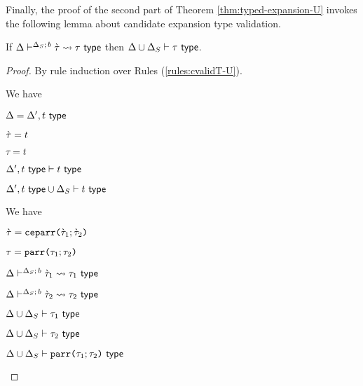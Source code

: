 
Finally, the proof of the second part of Theorem \ref{thm:typed-expansion-U} invokes the following lemma about candidate expansion type validation.
\begin{lemma}\label{lemma:candidate-expansion-type-validation}
If $\Delta\vdash^{\Delta_S;\,b} \grave{\tau} \leadsto \tau~\mathsf{type}$ then ${\Delta}\cup{\Delta_S} \vdash \tau~\mathsf{type}$.
\end{lemma}
\begin{proof} By rule induction over Rules (\ref{rules:cvalidT-U}).
\begin{byCases}
\item[\text{(\ref{rule:cvalidT-U-tvar})}] We have 
\begin{pfsteps*}
   \item $\Delta=\Delta', t~\mathsf{type}$ 
   \item $\grave{\tau}=t$ 
   \item $\tau=t$ 
   \item $\Delta', t~\mathsf{type} \vdash t~\mathsf{type}$  
   \item ${\Delta', t~\mathsf{type}}\cup{\Delta_S} \vdash t~\mathsf{type}$ 
 \end{pfsteps*} 
\resetpfcounter

\item[\text{(\ref{rule:cvalidT-U-parr})}] We have
\begin{pfsteps*}
  \item $\grave{\tau}=\texttt{ceparr}\texttt{(}\grave{\tau}_1; \grave{\tau}_2\texttt{)}$ 
  \item $\tau=\texttt{parr}\texttt{(}\tau_1; \tau_2\texttt{)}$ 
  \item $\Delta\vdash^{\Delta_S;\,b} \grave{\tau}_1 \leadsto \tau_1~\mathsf{type}$  
  \item $\Delta\vdash^{\Delta_S;\,b} \grave{\tau}_2 \leadsto \tau_2~\mathsf{type}$  
  \item ${\Delta}\cup{\Delta_S} \vdash \tau_1~\mathsf{type}$  
  \item ${\Delta}\cup{\Delta_S} \vdash \tau_2~\mathsf{type}$  
  \item ${\Delta}\cup{\Delta_S} \vdash \texttt{parr}\texttt{(}\tau_1; \tau_2\texttt{)}~\mathsf{type}$ 
\end{pfsteps*}
\resetpfcounter


\end{byCases}
\end{proof}
